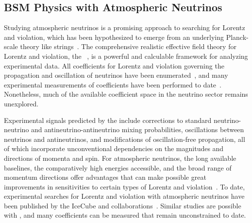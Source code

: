 \subsection{BSM Physics with Atmospheric Neutrinos}
\label{sec:nonaccel-atm-bsm}

Studying  atmospheric neutrinos is a promising approach
to searching for Lorentz and  violation,
which has been hypothesized
to emerge from an underlying Planck-scale theory like strings~\cite{Kostelecky:1988zi,Kostelecky:1991ak}.
The comprehensive realistic effective field theory
for Lorentz and  violation,
the ~\cite{Kostelecky:1994rn,Colladay:1996iz,Colladay:1998fq,Kostelecky:2003fs},
is a powerful and calculable framework
for analyzing experimental data.
All  coefficients for Lorentz and  violation
governing the propagation and oscillation of neutrinos
have been enumerated~\cite{Kostelecky:2003cr,Kostelecky:2011gq},
and many experimental measurements of  coefficients 
have been performed to date~\cite{Kostelecky:2008ts}.
Nonetheless,
much of the available  coefficient space 
in the neutrino sector remains unexplored.

Experimental signals predicted by the  include
corrections to standard neutrino-neutrino 
and antineutrino-antineutrino mixing probabilities,
oscillations between neutrinos and antineutrinos,
and modifications of oscillation-free propagation,
all of which incorporate unconventional dependencies
on the magnitudes and directions of momenta and spin.
For  atmospheric neutrinos,
the long available baselines,
the comparatively high energies accessible,
and the broad range of momentum directions
offer advantages that can make possible great
improvements 
in sensitivities to certain types of Lorentz and  violation~\cite{Kostelecky:2003cr,Kostelecky:2011gq,Kostelecky:2003xn,Kostelecky:2004hg,Diaz:2009qk,Diaz:2013saa,Diaz:2013wia}.
To date,
experimental searches for Lorentz and  violation
with atmospheric neutrinos have been published 
by the IceCube and \superk collaborations~\cite{Abbasi:2010kx,Abe:2014wla,Aartsen:2017ibm}.
Similar studies are possible with ,
and many  coefficients can be measured that remain unconstrained to date.

